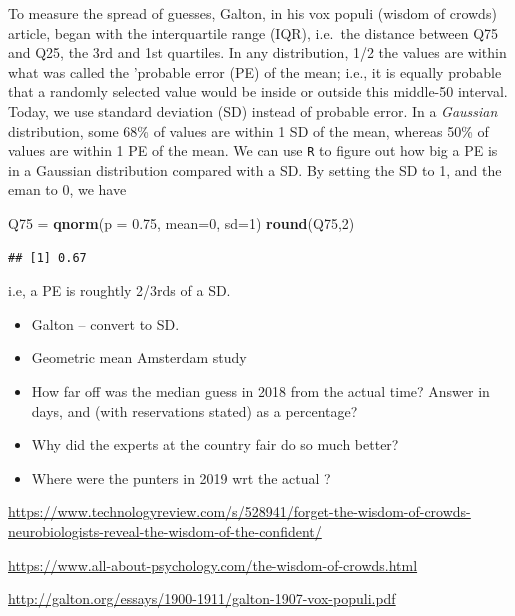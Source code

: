 \documentclass[]{book}
\newenvironment{Shaded}{\begin{snugshade}}{\end{snugshade}}
\newcommand{\DataTypeTok}[1]{\textcolor[rgb]{0.13,0.29,0.53}{#1}}
\newcommand{\DecValTok}[1]{\textcolor[rgb]{0.00,0.00,0.81}{#1}}
\newcommand{\FloatTok}[1]{\textcolor[rgb]{0.00,0.00,0.81}{#1}}
\newcommand{\KeywordTok}[1]{\textcolor[rgb]{0.13,0.29,0.53}{\textbf{#1}}}
\newcommand{\NormalTok}[1]{#1}
\newcommand{\StringTok}[1]{\textcolor[rgb]{0.31,0.60,0.02}{#1}}
\begin{document}
To measure the spread of guesses, Galton, in his vox populi (wisdom of crowds) article, began with the interquartile range (IQR), i.e.~the distance between Q75 and Q25, the 3rd and 1st quartiles. In any distribution, 1/2 the values are within what was called the 'probable error (PE) of the mean; i.e., it is equally probable that a randomly selected value would be inside or outside this middle-50 interval. Today, we use standard deviation (SD) instead of probable error. In a \emph{Gaussian} distribution, some 68\% of values are within 1 SD of the mean, whereas 50\% of values are within 1 PE of the mean. We can use \texttt{R} to figure out how big a PE is in a Gaussian distribution compared with a SD. By setting the SD to 1, and the eman to 0, we have

\begin{Shaded}
\begin{Highlighting}[]
\NormalTok{Q75 =}\StringTok{ }\KeywordTok{qnorm}\NormalTok{(}\DataTypeTok{p =} \FloatTok{0.75}\NormalTok{, }\DataTypeTok{mean=}\DecValTok{0}\NormalTok{, }\DataTypeTok{sd=}\DecValTok{1}\NormalTok{)}
\KeywordTok{round}\NormalTok{(Q75,}\DecValTok{2}\NormalTok{)}
\end{Highlighting}
\end{Shaded}

\begin{verbatim}
## [1] 0.67
\end{verbatim}

i.e, a PE is roughtly 2/3rds of a SD.

\begin{itemize}
\item
  Galton -- convert to SD.
\item
  Geometric mean Amsterdam study
\item
  How far off was the median guess in 2018 from the actual time? Answer in days, and (with reservations stated) as a percentage?
\item
  Why did the experts at the country fair do so much better?
\item
  Where were the punters in 2019 wrt the actual ?
\end{itemize}

\url{https://www.technologyreview.com/s/528941/forget-the-wisdom-of-crowds-neurobiologists-reveal-the-wisdom-of-the-confident/}

\url{https://www.all-about-psychology.com/the-wisdom-of-crowds.html}

\url{http://galton.org/essays/1900-1911/galton-1907-vox-populi.pdf}
\end{document}
